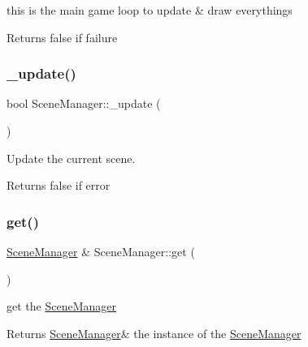 this is the main game loop to update \& draw everythings 

\begin{DoxyReturn}{Returns}
false if failure 
\end{DoxyReturn}
\mbox{\label{class_scene_manager_af57dd8e436c025bdeb7c2ec751b62ba9}} 
\subsubsection{\texorpdfstring{\+\_\+update()}{\_update()}}
{\footnotesize\ttfamily bool Scene\+Manager\+::\+\_\+update (\begin{DoxyParamCaption}{ }\end{DoxyParamCaption})\hspace{0.3cm}{\ttfamily [protected]}}



Update the current scene. 

\begin{DoxyReturn}{Returns}
false if error 
\end{DoxyReturn}
\mbox{\label{class_scene_manager_a8467467ece15e24aebc95cc6141a6200}} 
\subsubsection{\texorpdfstring{get()}{get()}}
{\footnotesize\ttfamily \hyperlink{class_scene_manager}{Scene\+Manager} \& Scene\+Manager\+::get (\begin{DoxyParamCaption}{ }\end{DoxyParamCaption})\hspace{0.3cm}{\ttfamily [static]}}



get the \hyperlink{class_scene_manager}{Scene\+Manager} 

\begin{DoxyReturn}{Returns}
\hyperlink{class_scene_manager}{Scene\+Manager}\& the instance of the \hyperlink{class_scene_manager}{Scene\+Manager} 
\end{DoxyReturn}
\mbox{\label{class_scene_manager_a5fcdd1b1f88f235ca33abc94f01d3755}} 
